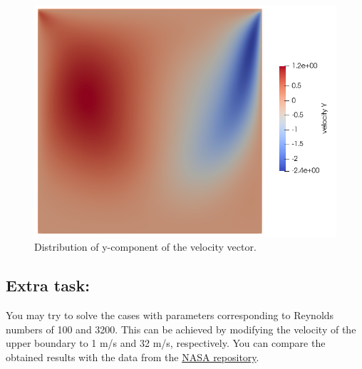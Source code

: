 \begin{figure}[H]
\centering
\includegraphics[scale=0.5]{DC_velocity_y}
\caption{Distribution of y-component of the velocity vector.}\label{fg:DC_velocity_y}
\end{figure} 

\subsection*{Extra task:}

You may try to solve the cases with parameters corresponding to Reynolds numbers of 100 and 3200.
This can be achieved by modifying the velocity of the upper boundary to 1 m/s and 32 m/s, respectively.
You can compare the obtained results with the data from the \href{https://www.grc.nasa.gov/www/wind/valid/cavity/cavity.html}{NASA repository}.

\hfill
